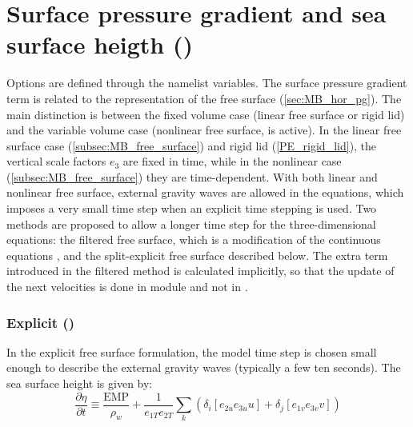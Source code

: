 \documentclass[../main/NEMO_manual]{subfiles}
\begin{document}
\section[Surface pressure gradient and sea surface heigth (\textit{dynspg.F90})]{Surface pressure gradient and sea surface heigth (\protect{})}
\label{sec:MBZ_dyn_hpg_spg}


Options are defined through the  namelist variables.
The surface pressure gradient term is related to the representation of the free surface (\autoref{sec:MB_hor_pg}).
The main distinction is between the fixed volume case (linear free surface or rigid lid) and
the variable volume case (nonlinear free surface,  is active).
In the linear free surface case (\autoref{subsec:MB_free_surface}) and rigid lid (\autoref{PE_rigid_lid}),
the vertical scale factors $e_{3}$ are fixed in time,
while in the nonlinear case (\autoref{subsec:MB_free_surface}) they are time-dependent.
With both linear and nonlinear free surface, external gravity waves are allowed in the equations,
which imposes a very small time step when an explicit time stepping is used.
Two methods are proposed to allow a longer time step for the three-dimensional equations:
the filtered free surface, which is a modification of the continuous equations \iffalse (see \autoref{eq:MB_flt?}) \fi ,
and the split-explicit free surface described below.
The extra term introduced in the filtered method is calculated implicitly,
so that the update of the next velocities is done in module  and not in .

\subsubsection[Explicit (\texttt{\textbf{key\_dynspg\_exp}})]{Explicit (\protect{})}
\label{subsec:MBZ_dyn_spg_exp}

In the explicit free surface formulation, the model time step is chosen small enough to
describe the external gravity waves (typically a few ten seconds).
The sea surface height is given by:
\begin{equation}
  \label{eq:MBZ_dynspg_ssh}
  \frac{\partial \eta }{\partial t}\equiv \frac{\text{EMP}}{\rho_w }+\frac{1}{e_{1T}
    e_{2T} }\sum\limits_k {\left( {\delta_i \left[ {e_{2u} e_{3u} u}
        \right]+\delta_j \left[ {e_{1v} e_{3v} v} \right]} \right)}
\end{equation}
\end{document}
